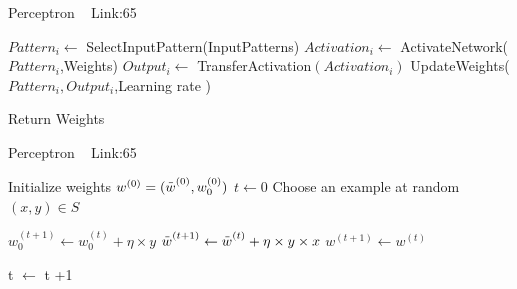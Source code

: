 \documentclass[a4paper]{article}
\begin{document}
  \begin{algorithm}
   \caption{Perceptron ~\cite{perceptron1} Link:{65}}
    \begin{algorithmic}[1]
    
            \State $Pattern_i \leftarrow$ SelectInputPattern(InputPatterns)
            \State $Activation_i \leftarrow$ ActivateNetwork($Pattern_i$,Weights)
            \State $Output_i \leftarrow$ TransferActivation$(Activation_i)$
            \State UpdateWeights($Pattern_i,Output_i$,Learning rate )
        \EndFor
        
       
       \State Return Weights



 

\end{algorithmic}
\end{algorithm}

 \begin{algorithm}
   \caption{Perceptron  ~\cite{perceptron2} Link:{65}}
   
    \begin{algorithmic}[1]
    
    
    
    \Statex Initialize weights $w^{(0)} = (\overset{\mathunderscore} {w}^{(0)},w_{0}^{(0)})$
    \Statex $t \leftarrow 0 $
    \State Choose an example at random $(x,y)\in S$
    
   \State $w_{0}^{(t+1)} \leftarrow w_{0}^{(t)} + \eta \times y  $
   \State $\overset{\mathunderscore} {w}^{(t+1)} \leftarrow \overset{\mathunderscore} {w}^{(t)} + \eta \times y \times x  $
   \Else
    \State $w^{(t+1)} \leftarrow w^{(t)}$
    
    \EndIf
    
  
    
    \EndWhile
    
    \State t $\leftarrow $ t +1 
   
   
\end{algorithmic}
\end{algorithm}
\end{document}

